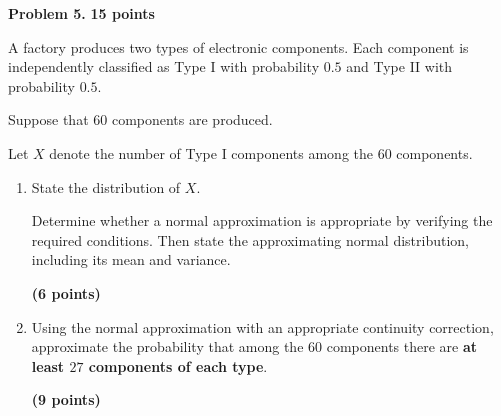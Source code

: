 \documentclass[11pt]{article}
\begin{document}
 



\newpage


\begin{problemheader}
\textbf{Problem 5.} \hfill \textbf{15 points}
\end{problemheader}

A factory produces two types of electronic components. Each component is
independently classified as Type I with probability \(0.5\) and Type II
with probability \(0.5\).

Suppose that \(60\) components are produced.

Let \(X\) denote the number of Type I components among the \(60\)
components.

\begin{enumerate}[label=(\alph*),leftmargin=*,itemsep=0.9em]

    \item State the distribution of \(X\).

    Determine whether a normal approximation is appropriate by verifying
    the required conditions. Then state the approximating normal
    distribution, including its mean and variance.

    \hfill \textbf{(6 points)}

    \item Using the normal approximation with an appropriate continuity
    correction, approximate the probability that among the \(60\)
    components there are \textbf{at least \(27\) components of each type}.

    \hfill \textbf{(9 points)}

\end{enumerate}
\end{document}
